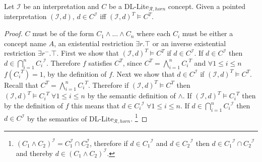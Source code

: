\begin{lemma}
Let $\mathcal{I}$ be an interpretation and $C$ be a DL-Lite$_{\mathcal{R}, horn}$ concept. Given a pointed interpretation $(\mathcal{I}, d)$, $d \in C^{\mathcal{I}}$ iff $(\mathcal{I}, d)^T \models C^T$.
\end{lemma}
\begin{proof}
$C$ must be of the form $C_1 \wedge ... \wedge C_n$ where each  $C_i$ must be either a concept name $A$, an existential restriction $\exists r.\top$ or an inverse existential restriction $\exists r^{-}.\top$. \newline
First we show that $(\mathcal{I}, d)^T \models C^T$ if $d\in C^\mathcal{I}$.
\newline
If $d \in C^{\mathcal{I}}$ then $d\in \bigcap^{n}_{i=1}{C_{i}}^{\mathcal{I}}$. Therefore $f$ satisfies $C^T$, since $C^T = \bigwedge_{i = 1}^{n} {C_i}^T$ and $\forall 1 \leq i \leq n$ $f({C_i}^T) = 1$, by the definition of $f$.\newline
Next we show that $d\in C^\mathcal{I}$ if $(\mathcal{I}, d)^T \models C^T$.
\newline
Recall that $C^T = \bigwedge_{i = 1}^{n} {C_i}^T$. Therefore if $(\mathcal{I}, d)^T \models C^T$ then  $(\mathcal{I}, d) ^T \models {C_{i}}^T \; \forall 1 \leq i \leq n$ by the semantic definition of $\wedge$. If $(\mathcal{I}, d)^T \models {C_i }^T$ then by the definition of $f$ this means that $d\in{C_i}^\mathcal{I}\; \forall 1 \leq i \leq n$. If $d\in \bigcap^{n}_{i=1}{C_{i}}^{\mathcal{I}}$ then $d \in C^\mathcal{I}$ by the semantics of DL-Lite$_{\mathcal{R}, horn}$. \footnote{$ (C_{1} \wedge C_{2})^{\mathcal{I}} = C_{1}^{\mathcal{I}} \cap C_{2}^{\mathcal{I}} $, therefore if $d\in {C_1}^\mathcal{I}$ and $d\in {C_2}^{\mathcal{I}}$ then $d\in {C_1}^\mathcal{I} \cap {C_2}^\mathcal{I}$ and thereby $d\in (C_1 \wedge C_2)^\mathcal{I}$.}
\end{proof}
